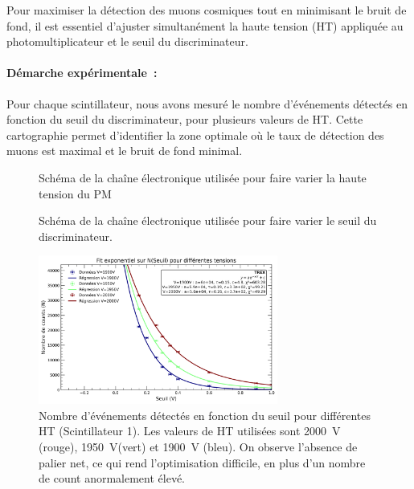 \documentclass[a4paper,12pt,twoside]{article}
\begin{document}

\vspace{1em}
\begin{center}
\begin{tcolorbox}[colback=blue!5!white, colframe=blue!60!black, title=Optimisation conjointe des réglages électroniques]
Pour maximiser la détection des muons cosmiques tout en minimisant le bruit de fond, il est essentiel d’ajuster simultanément la haute tension (HT) appliquée au photomultiplicateur et le seuil du discriminateur.
\end{tcolorbox}
\end{center}


\paragraph{Démarche expérimentale~:}
Pour chaque scintillateur, nous avons mesuré le nombre d’événements détectés en fonction du seuil du discriminateur, pour plusieurs valeurs de HT. Cette cartographie permet d’identifier la zone optimale où le taux de détection des muons est maximal et le bruit de fond minimal.

\begin{figure}[!h]
  \centering
  
  \caption{Schéma de la chaîne électronique utilisée pour faire varier la haute tension du PM}
  \label{fig:variation_HT}
\end{figure}

\begin{figure}[!h]
  \centering
  
  \caption{Schéma de la chaîne électronique utilisée pour faire varier le seuil du discriminateur.}
  \label{fig:variation_seuil}
\end{figure}


\begin{figure}[H]
    \centering
    \includegraphics[width=0.7\textwidth]{Images/Threshold_Scintillateur_1.png}
    \caption{Nombre d’événements détectés en fonction du seuil pour différentes HT (Scintillateur 1).
    Les valeurs de HT utilisées sont 2000~V (rouge), 1950~V(vert) et 1900~V (bleu).
    On observe l'absence de palier net, ce qui rend l'optimisation difficile, en plus d'un nombre de count anormalement élevé.}
    \label{fig:optimisation_scint1}
\end{figure}
\end{document}
